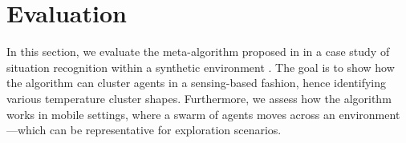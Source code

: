 
\section{Evaluation}
\label{s:eval}


In this section, we evaluate the meta-algorithm proposed in 
 in a case study of situation recognition within a synthetic environment .
%
The goal  is to show how the algorithm
 can cluster agents in a sensing-based fashion,
 hence identifying various temperature cluster shapes.
%
Furthermore, we assess how the algorithm works in mobile settings,
 where a swarm of agents moves across an environment---which can be representative for exploration scenarios.
%


